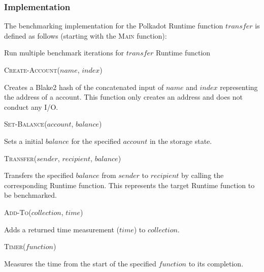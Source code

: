 \documentclass[11pt,a4paper]{article}
\newcommand{\SubItem}[1]{
    {\setlength\itemindent{15pt} \item[-] #1}
}
\begin{document}
\subsubsection*{Implementation}
The benchmarking implementation for the Polkadot Runtime function $transfer$ is
defined as follows (starting with the \textsc{Main} function):
\newline

\begin{algorithm}[H]\label{sec:algo-benchmark-transfer}
  \caption{Run multiple benchmark iterations for $transfer$ Runtime function}
  \SetAlgoLined {} \BlankLine {} \BlankLine {}
\end{algorithm}

\begin{itemize}
  \item \textsc{Create-Account($name$, $index$)} \SubItem{Creates a Blake2 hash
      of the concatenated input of $name$ and $index$ representing the address
      of a account. This function only creates an address and does not conduct
      any I/O.}
  \item \textsc{Set-Balance($account$, $balance$)} \SubItem{Sets a initial
      $balance$ for the specified $account$ in the storage state.}
  \item \textsc{Transfer($sender$, $recipient$, $balance$)} \SubItem{Transfers
      the specified $balance$ from $sender$ to $recipient$ by calling the
      corresponding Runtime function. This represents the target Runtime
      function to be benchmarked.}
  \item \textsc{Add-To($collection$, $time$)} \SubItem{Adds a returned time
      measurement ($time$) to $collection$.}
  \item \textsc{Timer($function$)} \SubItem{Measures the time from the start of
      the specified $function$ to its completion.}
\end{itemize}
\end{document}
